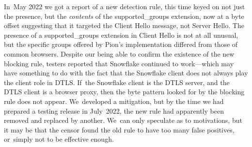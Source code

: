 \documentclass[letterpaper,twocolumn]{article}
\begin{document}
In~May 2022 we got a report of a new detection rule,
this time keyed on not just the presence, but the \emph{contents}
of the \mbox{supported\_groups} extension,
now at a byte offset suggesting that
it targeted the Client Hello message,
not Server Hello.
The presence of a \mbox{supported\_groups} extension in Client Hello is not at all unusual,
but the specific groups offered by Pion's implementation
differed from those of common browsers.
Despite our being able to confirm the existence of the new blocking rule,
testers reported that Snowflake continued to work---which
may have something to do with the fact that the Snowflake client
does not always play the client role in DTLS.
If~the Snowflake client is the DTLS server,
and the DTLS client is a browser proxy,
then the byte pattern looked for by the blocking rule does not appear.
We~developed a mitigation,
but by the time we had prepared a testing release in July~2022,
the new rule
had apparently been removed
and replaced by another.
We~can only speculate as to motivations,
but it may be that the censor found the old rule
to have too many false positives,
or~simply not to be effective enough.

\end{document}
